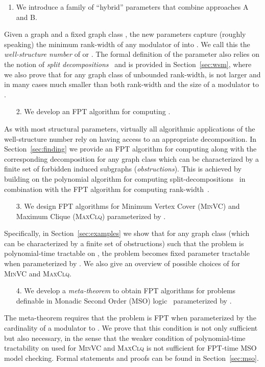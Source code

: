 \documentclass{llncs}
\begin{document}
\begin{enumerate}[leftmargin=*,nosep]
\item We introduce a family of ``hybrid'' parameters that combine approaches A and B. 
\end{enumerate}
\smallskip 
Given a graph  and a fixed graph class , the new parameters capture (roughly speaking) the minimum rank-width of any modulator of  into . We call this the \emph{well-structure number} of  or . The formal definition of the parameter also relies on the notion of \emph{split decompositions}~\cite{Cunningham82} and is provided in Section~\ref{sec:wsm}, where we also prove that for any graph class  of unbounded rank-width,  is not larger and in many cases much smaller than both rank-width and the size of a modulator to . 
\smallskip

\begin{enumerate}[leftmargin=*,nosep]
\item[2.] We develop an FPT algorithm for computing .
\end{enumerate}
\smallskip
As with most structural parameters, virtually all algorithmic applications of the well-structure number rely on having access to an appropriate decomposition. In Section~\ref{sec:finding} we provide an FPT algorithm for computing  along with the corresponding decomposition for any graph class  which can be characterized by a finite set of forbidden induced subgraphs (\emph{obstructions}). This is achieved by building on the polynomial algorithm for computing split-decompositions~\cite{GioanPaulTedderCorneil14} in combination with the FPT algorithm for computing rank-width~\cite{HlinenyOum08}.\smallskip

\begin{enumerate}[leftmargin=*,nosep]
\item[3.] We design FPT algorithms for Minimum Vertex Cover (\textsc{MinVC}) and Maximum Clique (\textsc{MaxClq}) parameterized by .
\end{enumerate}
\smallskip
Specifically, in Section~\ref{sec:examples} we show that for any graph class  (which can be characterized by a finite set of obstructions) such that the problem is polynomial-time tractable on , the problem becomes fixed parameter tractable when parameterized by . We also give an overview of possible choices of  for \textsc{MinVC} and \textsc{MaxClq}.
\smallskip

\begin{enumerate}[leftmargin=*,nosep]
\item[4.] We develop a \emph{meta-theorem} to obtain FPT algorithms for problems definable in Monadic Second Order (MSO) logic~\cite{CourcelleMakowskyRotics00} parameterized by .
\end{enumerate}
\smallskip
The meta-theorem requires that the problem is FPT when parameterized by the cardinality of a modulator to . We prove that this condition is not only sufficient but also necessary, in the sense that the weaker condition of polynomial-time tractability on  used for \textsc{MinVC} and \textsc{MaxClq} is not sufficient for FPT-time MSO model checking. Formal statements and proofs can be found in Section~\ref{sec:mso}.
\smallskip
\end{document}
